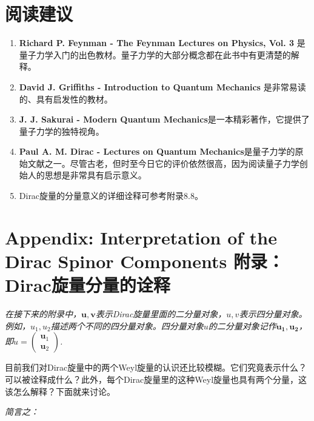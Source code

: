 \section*{阅读建议}
\begin{enumerate}
\item {\bf Richard P. Feynman - The Feynman Lectures on Physics, Vol. 3} 是量子力学入门的出色教材。量子力学的大部分概念都在此书中有更清楚的解释。
\item {\bf  David J. Griffiths - Introduction to Quantum Mechanics}
是非常易读的、具有启发性的教材。
\item {\bf  J. J. Sakurai - Modern Quantum Mechanics}是一本精彩著作，它提供了量子力学的独特视角。
\item {\bf Paul A. M. Dirac - Lectures on Quantum Mechanics}是量子力学的原始文献之一。尽管古老，但时至今日它的评价依然很高，因为阅读量子力学创始人的思想是非常具有启示意义。
\item Dirac旋量的分量意义的详细诠释可参考附录8.8。
\end{enumerate}


\section[附录：Dirac旋量分量的诠释]{Appendix: Interpretation of the Dirac Spinor Components \quad 附录：Dirac旋量分量的诠释}\label{sec8.8}
{\it 在接下来的附录中，$\mathbf{u}, \mathbf{v}$表示Dirac旋量里面的二分量对象，$u, v$表示四分量对象。例如，$u_1, u_2$描述两个不同的四分量对象。四分量对象$u$的二分量对象记作$\mathbf{u_1}, \mathbf{u_2}$，即$u = \begin{pmatrix} \mathbf{u}_1 \\ \mathbf{u}_2 \end{pmatrix}$.
}

目前我们对Dirac旋量中的两个Weyl旋量的认识还比较模糊。它们究竟表示什么？可以被诠释成什么？此外，每个Dirac旋量里的这种Weyl旋量也具有两个分量，这该怎么解释？下面就来讨论。

{\it 简言之：}


